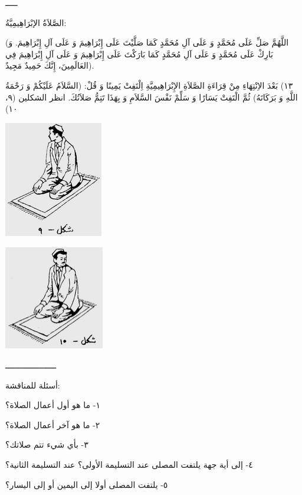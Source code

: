 \documentclass[a5paper]{article}
\begin{document}
ـــــ

الصَّلاَةُ الإبْرَاهِيمِيَّةُ:

(اللَّهُمَّ صَلِّ عَلَى مُحَمَّدٍ وَ عَلَى آلِ مُحَمَّدٍ كَمَا صَلَّيْتَ عَلَى إِبْرَاهِيمَ وَ عَلَى آلِ إِبْرَاهِيمَ. وَ بَارِكْ عَلَى مُحَمَّدٍ وَ عَلَى آلِ مُحَمَّدٍ كَمَا بَارَكْتَ عَلَى إِبْرَاهِيمَ وَ عَلَى آلِ إِبْرَاهِيمَ فِي العَالَمِينَ، إِنَّكَ حَمِيدٌ مَجِيدٌ).

١٣) بَعْدَ الاِنْتِهَاءِ مِنْ قِرَاءَةِ الصَّلاَةِ الإِبْرَاهِيمِيَّةِ اِلْتَفِتْ يَمِينًا وَ قُلْ: (السَّلاَمُ عَلَيْكُمْ وَ رَحْمَةُ اللَّهِ وَ بَرَكَاتَهُ) ثُمَّ الْتَفِتْ يَسَارًا وَ سَلِّمْ نَفْسَ السَّلاَمِ وَ بِهَذَا تَتِمُّ صَلاَتُكَ. انظر الشكلين (٩، ١٠)

\begin{center}
\includegraphics[width=1.698in,height=1.9902in]{MuhammadBagauddinlatinized-img351.png}
\end{center}
\begin{center}
\includegraphics[width=1.7165in,height=1.7925in]{MuhammadBagauddinlatinized-img352.png}
\end{center}
ـــــــــــــــــــــ 

أسئلة للمناقشة:

١- ما هو أول أعمال الصلاة؟

٢- ما هو آخر أعمال الصلاة؟

٣- بأي شيء تتم صلاتك؟

٤- إلى أية جهة يلتفت المصلى عند التسليمة الأولى؟ عند التسليمة الثانية؟

٥- يلتفت المصلى أولا إلى اليمين أو إلى اليسار؟
\end{document}
